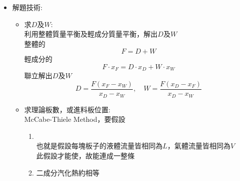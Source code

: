 \documentclass[../main.tex]{subfiles}
\begin{document}
\begin{itemize}
\begin{itemize}
\begin{itemize}
\begin{figure}[H]
        \caption{壓力與相對揮發度關係示意圖}
      \end{figure}
      可以看出不同壓下的相對揮發度:
      \begin{equation}
        \alpha_{\text{低}} = \frac{y_{\text{低}}/(1-y_{\text{低}})}{x_{\text{低}}/(1-x_{\text{低}})} >
        \alpha_{\text{高}} = \frac{y_{\text{高}}/(1-y_{\text{高}})}{x_{\text{高}}/(1-x_{\text{高}})}
      \end{equation}
    \end{itemize}
    \item 解題技術:
    \begin{itemize}
      \item 求$D$及$W$:\\
      利用整體質量平衡及輕成分質量平衡，解出$D$及$W$\\
      整體的
      \begin{equation}
        F = D + W
      \end{equation}
      輕成分的
      \begin{equation}
        F\cdot x_F = D\cdot x_D + W\cdot x_W
      \end{equation}
      聯立解出$D$及$W$
      \begin{equation}
        D = \frac{F(x_F - x_W)}{x_D - x_W}, \quad
        W = \frac{F(x_D - x_F)}{x_D - x_W}
      \end{equation}
      \item 求理論板數，或進料板位置:\\
      McCabe-Thiele Method，要假設
      \begin{enumerate}
        \item {}\\
          也就是假設每塊板子的液體流量皆相同為$L$，氣體流量皆相同為$V$\\
          此假設才能使，故能連成一整條
        \item 二成分汽化熱約相等\\

\end{enumerate}
\end{itemize}
\end{itemize}
\end{itemize}
\end{document}
